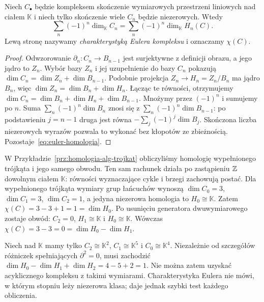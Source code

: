 \begin{twierdzenie}
\label{thm:euler-homologia}
Niech $C_\bullet$ będzie kompleksem
skończenie wymiarowych przestrzeni
liniowych nad ciałem $\mathbb K$
i niech tylko skończenie wiele $C_n$
będzie niezerowych. Wtedy
\begin{equation}\label{eq:euler-homologia}
 \sum_n(-1)^n\dim_{\mathbb K}C_n
 =\sum_n(-1)^n\dim_{\mathbb K}H_n(C).
\end{equation}
Lewą stronę nazywamy \emph{charakterystyką
Eulera kompleksu} i oznaczamy $\chi(C)$.
\end{twierdzenie}
\begin{proof}
Odwzorowanie $\partial_n:C_n\to B_{n-1}$ jest
surjektywne z definicji obrazu,
a jego jądro to $Z_n$.
Wybór bazy $Z_n$ i jej uzupełnienie
do bazy $C_n$ pokazują
$\dim C_n=\dim Z_n+\dim B_{n-1}$.
Podobnie projekcja $Z_n\to H_n=Z_n/B_n$
ma jądro $B_n$, więc
$\dim Z_n=\dim B_n+\dim H_n$.
Łącząc te równości, otrzymujemy
$\dim C_n=\dim B_n+\dim H_n+\dim B_{n-1}$.
Mnożymy przez $(-1)^n$ i sumujemy
po $n$. Suma
$\sum_n(-1)^n\dim B_n$
znosi się z
$\sum_n(-1)^n\dim B_{n-1}$:
po podstawieniu $j=n-1$
druga jest równa
$-\sum_j(-1)^j\dim B_j$.
Skończona liczba niezerowych
wyrazów pozwala to wykonać bez
kłopotów ze zbieżnością.
Pozostaje~\eqref{eq:euler-homologia}.
\end{proof}

\begin{przyklad}
W Przykładzie~\ref{prz:homologia-alg-trojkat} obliczyliśmy
homologię wypełnionego trójkąta i jego samego obwodu.
Ten sam rachunek działa po zastąpieniu $\mathbb{Z}$ dowolnym
ciałem $\mathbb K$: równości wyznaczające cykle i brzegi
zachowują postać. Dla wypełnionego trójkąta wymiary grup
łańcuchów wynoszą $\dim C_0=3$, $\dim C_1=3$,
$\dim C_2=1$, a jedyna niezerowa homologia to
$H_0\cong\mathbb K$. Zatem $\chi(C)=3-3+1=1=\dim H_0$.
Po usunięciu generatora dwuwymiarowego zostaje obwód:
$C_2=0$, $H_1\cong\mathbb K$ i $H_0\cong\mathbb K$.
Wówczas $\chi(C)=3-3=0=\dim H_0-\dim H_1$.
\end{przyklad}

\begin{przyklad}
Niech nad $\mathbb K$ mamy tylko
$C_2\cong\mathbb K^2$, $C_1\cong\mathbb K^5$
i $C_0\cong\mathbb K^4$.
Niezależnie od szczegółów różniczek
spełniających $\partial^2=0$, musi zachodzić
$\dim H_0-\dim H_1+\dim H_2=4-5+2=1$.
Nie można zatem uzyskać
acyklicznego kompleksu z takimi
wymiarami. Charakterystyka Eulera
nie mówi, w którym stopniu leży
niezerowa klasa; daje jednak
szybki test każdego obliczenia.
\end{przyklad}

